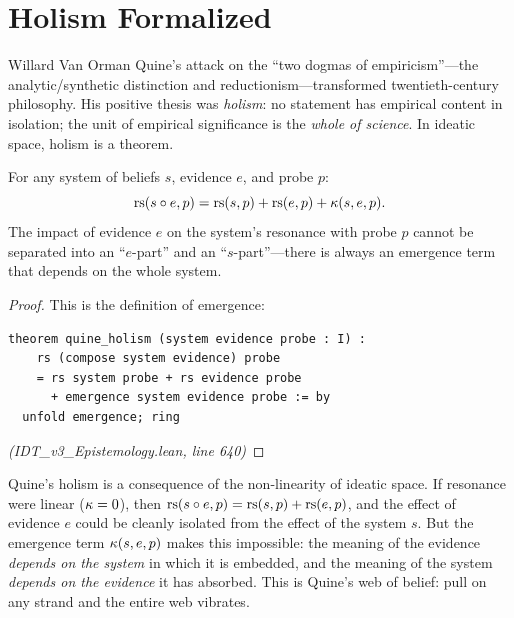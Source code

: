 \section{Holism Formalized}

Willard Van Orman Quine's attack on the ``two dogmas of empiricism''---the
analytic/synthetic distinction and reductionism---transformed twentieth-century
philosophy. His positive thesis was \emph{holism}: no statement has empirical
content in isolation; the unit of empirical significance is the \emph{whole of
science}. In ideatic space, holism is a theorem.

\begin{theorem}
\label{thm:quine-holism}
For any system of beliefs $s$, evidence $e$, and probe $p$:
\[
  \mathrm{rs}(s \circ e, p) = \mathrm{rs}(s, p) + \mathrm{rs}(e, p) + \kappa(s, e, p).
\]
The impact of evidence $e$ on the system's resonance with probe $p$ cannot be
separated into an ``$e$-part'' and an ``$s$-part''---there is always an
emergence term that depends on the whole system.
\end{theorem}

\begin{proof}
This is the definition of emergence:
\begin{lstlisting}
theorem quine_holism (system evidence probe : I) :
    rs (compose system evidence) probe
    = rs system probe + rs evidence probe
      + emergence system evidence probe := by
  unfold emergence; ring
\end{lstlisting}
\textit{(IDT\_v3\_Epistemology.lean, line 640)}
\end{proof}

\begin{interpretation}
Quine's holism is a consequence of the non-linearity of ideatic space. If
resonance were linear ($\kappa = 0$), then $\mathrm{rs}(s \circ e, p) = \mathrm{rs}(s,p) +
\mathrm{rs}(e,p)$, and the effect of evidence $e$ could be cleanly isolated from the
effect of the system $s$. But the emergence term $\kappa(s,e,p)$ makes this
impossible: the meaning of the evidence \emph{depends on the system} in which
it is embedded, and the meaning of the system \emph{depends on the evidence} it
has absorbed. This is Quine's web of belief: pull on any strand and the entire
web vibrates.
\end{interpretation}

